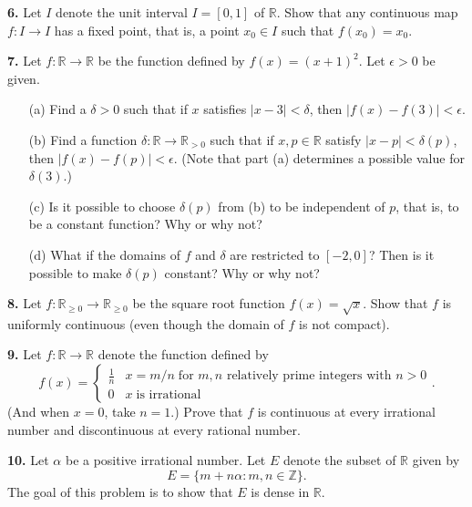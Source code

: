 \documentclass[12pt]{article}
\begin{document}
\medskip

\noindent \textbf{6.} Let $I$ denote the unit interval $I = [0,1]$ of $\mathbb{R}$. Show that any continuous map $f : I \to I$ has a fixed point, that is, a point $x_0 \in I$ such that $f(x_0) = x_0$. 

\medskip



\noindent \textbf{7.} Let $f : \mathbb{R} \to \mathbb{R}$ be the function defined by $f(x) = (x+1)^2.$ Let $\epsilon > 0$ be given. 
\begin{enumerate}
\item[(a)] Find a $\delta > 0$ such that if $x$ satisfies $|x - 3| < \delta$, then $|f(x) - f(3)| < \epsilon$. 
\item[(b)] Find a function $\delta : \mathbb{R} \to \mathbb{R}_{> 0}$ such that if $x, p \in \mathbb{R}$ satisfy $|x - p| < \delta(p)$, then $|f(x) - f(p)| < \epsilon$. (Note that part (a) determines a possible value for $\delta(3)$.)
\item[(c)] Is it possible to choose $\delta(p)$ from (b) to be independent of $p$, that is, to be a constant function? Why or why not?
\item[(d)] What if the domains of $f$ and $\delta$ are restricted to $[-2,0]$? Then is it possible to make $\delta(p)$ constant? Why or why not?
\end{enumerate}

\medskip




\noindent \textbf{8.} Let $f : \mathbb{R}_{\geqslant 0} \to \mathbb{R}_{\geqslant 0}$ be the square root function $f(x) = \sqrt{x}$. Show that $f$ is uniformly continuous (even though the domain of $f$ is not compact). 

\medskip

\noindent \textbf{9.} Let $f : \mathbb{R} \to \mathbb{R}$ denote the function defined by 
\[
f(x) = \begin{cases}
\frac{1}{n} & x = m/n \; \text{for $m,n$ relatively prime integers with $n > 0$} \\
0 & x \; \text{is irrational}
\end{cases}.
\]
(And when $x = 0$, take $n = 1$.) Prove that $f$ is continuous at every irrational number and discontinuous at every rational number. 

\medskip 

\noindent \textbf{10.} Let $\alpha$ be a positive irrational number. Let $E$ denote the subset of $\mathbb{R}$ given by 
\[
E = \{m + n\alpha : m, n \in \mathbb{Z}\}.
\]
The goal of this problem is to show that $E$ is dense in $\mathbb{R}$. 
\end{document}

